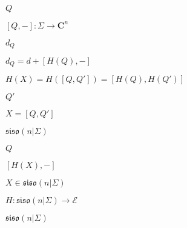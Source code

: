 \begin{preview}
\setcounter{equation}{0}%
\( Q \)
\end{preview}

\begin{preview}
\setcounter{equation}{0}%
\( [Q, -] : \Sigma \to \mathbf{C}^{n}  \)
\end{preview}

\begin{preview}
\setcounter{equation}{0}%
\( d_Q \)
\end{preview}

\begin{preview}
\setcounter{equation}{0}%
\( d_Q = d+[H(Q),-] \)
\end{preview}

\begin{preview}
\setcounter{equation}{0}%
\( H(X) = H([Q,Q']) = [H(Q), H(Q')]  \)
\end{preview}

\begin{preview}
\setcounter{equation}{0}%
\( Q' \)
\end{preview}

\begin{preview}
\setcounter{equation}{0}%
\( X = [Q,Q'] \)
\end{preview}

\begin{preview}
\setcounter{equation}{0}%
\(  \mathfrak{siso}(n | \Sigma)  \)
\end{preview}

\begin{preview}
\setcounter{equation}{0}%
\( Q \)
\end{preview}

\begin{preview}
\setcounter{equation}{0}%
\( [H(X) , -] \)
\end{preview}

\begin{preview}
\setcounter{equation}{0}%
\( X\in \mathfrak{siso}(n | \Sigma) \)
\end{preview}

\begin{preview}
\setcounter{equation}{0}%
\( H:\mathfrak{siso}(n | \Sigma) \to \mathcal{E} \)
\end{preview}

\begin{preview}
\setcounter{equation}{0}%
\( \mathfrak{siso}(n | \Sigma) \)
\end{preview}

